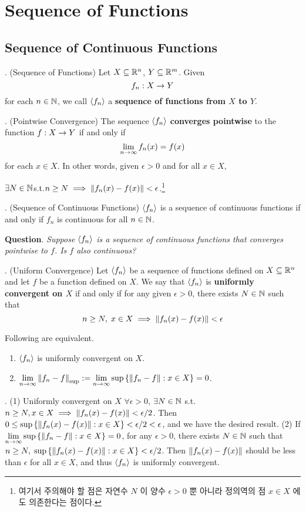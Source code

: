 \chapter{Sequence of Functions}

\section{Sequence of Continuous Functions}

. (Sequence of Functions) Let \(X \subseteq \mathbb{R}^n\), \(Y \subseteq \mathbb{R}^m\). Given
\[
	f_n: X\rightarrow Y
\]
for each \(n\in \mathbb{N}\), we call \(\left\langle f_n \right\rangle\) a \textbf{sequence of functions from \(X\) to \(Y\)}.

. (Pointwise Convergence) The sequence \(\left\langle f_n \right\rangle\) \textbf{converges pointwise} to the function \(f: X \rightarrow Y\) if and only if
\[
	\lim_{n\rightarrow \infty} f_n(x) = f(x)
\]
for each \(x \in X\). In other words, given \(\epsilon > 0\) and for all \(x \in X\),
\begin{center}
	\(\exists N\in \mathbb{N}\)\quad  s.t.\quad \(n \geq N \implies \left\lVert f_n(x) - f(x)\right\rVert < \epsilon\).\footnote{여기서 주의해야 할 점은 자연수 \(N\) 이 양수 \(\epsilon > 0\) 뿐 아니라 정의역의 점 \(x\in X\) 에도 의존한다는 점이다.}
\end{center}

. (Sequence of Continuous Functions) \(\left\langle f_n \right\rangle\) is a sequence of continuous functions if and only if \(f_n\) is continuous for all \(n\in \mathbb{N}\).

\textbf{Question}. \textit{Suppose \(\left\langle f_n \right\rangle\) is a sequence of continuous functions that converges pointwise to \(f\). Is \(f\) also continuous?}

. (Uniform Convergence) Let \(\left\langle f_n \right\rangle\) be a sequence of functions defined on \(X \subseteq \mathbb{R}^n\) and let \(f\) be a function defined on \(X\). We say that \(\left\langle f_n \right\rangle\) is \textbf{uniformly convergent on \(X\)} if and only if for any given \(\epsilon > 0\), there exists \(N\in \mathbb{N}\) such that
\[
	n\geq N,\; x\in X \implies \left\lVert f_n(x) - f(x)\right\rVert < \epsilon
\]

 Following are equivalent.
\begin{enumerate}
	\item \(\left\langle f_n \right\rangle\) is uniformly convergent on \(X\).
	\item \(\displaystyle \lim_{n\rightarrow\infty} \left\lVert f_n-f\right\rVert_{\sup} := \lim_{n\rightarrow \infty} \sup \left\{\left\lVert f_n-f\right\rVert: x\in X\right\} = 0\).
\end{enumerate}

\pf. (1) Uniformly convergent on \(X\) \mimp \(\forall \epsilon > 0\), \(\exists N \in \mathbb{N}\) s.t. \(n \geq N, x\in X \implies \left\lVert f_n(x) - f(x)\right\rVert < \epsilon/2\). Then \(0 \leq \sup\left\{\left\lVert f_n(x) - f(x)\right\rVert : x \in X \right\} < \epsilon/2 < \epsilon\), and we have the desired result.
(2) If \(\displaystyle \lim_{n\rightarrow \infty} \sup \left\{\left\lVert f_n-f\right\rVert: x\in X\right\} = 0\), for any \(\epsilon > 0\), there exists \(N\in \mathbb{N}\) such that \(n\geq N,\; \sup\left\{\left\lVert f_n(x) - f(x)\right\rVert : x \in X \right\} < \epsilon / 2\). Then \(\left\lVert f_n(x) - f(x)\right\rVert\) should be less than \(\epsilon\) for all \(x\in X\), and thus \(\left\langle f_n \right\rangle\) is uniformly convergent.

